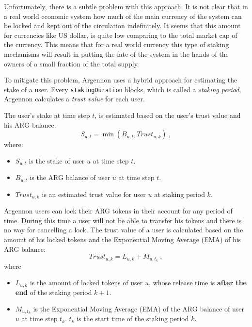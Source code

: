 Unfortunately, there is a subtle problem with this approach. It is not clear that in a real world economic system
how much of the main currency of the system can be locked and kept out of the circulation indefinitely. It seems that
this amount for currencies like US dollar, is quite low comparing to the total market cap of the currency.
This means that for a real world currency this type of staking mechanisms will result in putting the
fate of the system in the hands of the owners of a small fraction of the total supply.

To mitigate this problem, Argennon uses a hybrid approach for estimating the stake of a user.
Every \texttt{stakingDuration} blocks, which is called a \emph{staking period}, Argennon calculates
a \emph{trust value} for each user.

The user's stake
at time step \(t\), is estimated based on the user's trust value and his ARG balance:
\begin{equation}
    S_{u,t} = \min (B_{u,t}, Trust_{u,k})\ ,\label{eq:stake}
\end{equation}
where:
\begin{itemize}
    \item \(S_{u,t}\) is the stake of user \(u\) at time step \(t\).
    \item \(B_{u,t}\) is the ARG balance of user \(u\) at time step \(t\).
    \item \(Trust_{u,k}\) is an estimated trust value for user \(u\) at staking period \(k\).
\end{itemize}

Argennon users can lock their ARG tokens in their account for any period of time. During this time a user
will not be able to transfer his tokens and there is no way for cancelling a lock.
The trust value of a user is calculated based on the amount of his locked tokens and the
Exponential Moving Average (EMA) of his ARG balance:
\begin{equation}
    Trust_{u,k} = L_{u,k} + M_{u,t_k}\ ,\label{eq:trust}
\end{equation}
where
\begin{itemize}
    \item $L_{u,k}$ is the amount of locked tokens of user $u$, whose release time is \textbf{after the end} of
    the staking period $k+1$.
    \item $M_{u,t_k}$ is the Exponential Moving Average (EMA) of the ARG balance of user \(u\) at time step \(t_k\).
    $t_k$ is the start time of the staking period $k$.
\end{itemize}

